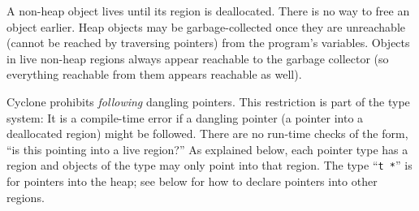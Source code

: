 A non-heap object lives until its region is deallocated.  There is no
way to free an object earlier.  Heap objects may be garbage-collected
once they are unreachable (cannot be reached by traversing pointers)
from the program's variables.  Objects in live non-heap regions always
appear reachable to the garbage collector (so everything reachable
from them appears reachable as well).

Cyclone prohibits \emph{following} dangling pointers.  This
restriction is part of the type system: It is a compile-time error if
a dangling pointer (a pointer into a deallocated region) might be
followed.  There are no run-time checks of the form, ``is this
pointing into a live region?''  As explained below, each pointer type
has a region and objects of the type may only point into that region.
The type ``\texttt{t *}'' is for pointers into the heap; see below for
how to declare pointers into other regions.

